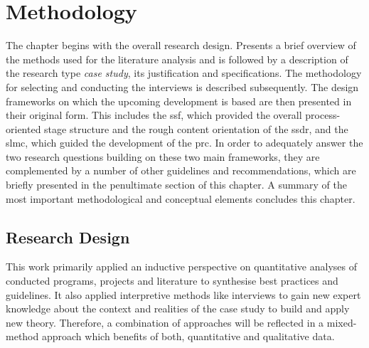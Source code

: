 \chapter{Methodology}

\label{chapter3}

The chapter begins with the overall research design. Presents a brief overview of the methods used for the literature analysis and  is followed by a description of the research type \textit{case study}, its justification and specifications. The methodology for  selecting and conducting the interviews is described subsequently. The design frameworks on which the upcoming development is based are then presented in their original form. This includes the \acrfull{ssf}, which provided the overall process-oriented stage structure and the rough content orientation of the \acrfull{ssdr}, and the \acrfull{slmc}, which guided the development of the \acrfull{prc}. In order to adequately answer the two research questions building on these two main frameworks, they are complemented by a number of other guidelines and recommendations, which are briefly presented in the penultimate section of this chapter. A summary of the most important methodological and conceptual elements concludes this chapter.   


\section{Research Design}

This work primarily applied an inductive perspective on quantitative analyses of conducted programs, projects and literature to synthesise best practices and guidelines. It also applied interpretive methods like interviews to gain new expert knowledge about the context and realities of the case study to build and apply new theory. Therefore, a combination of approaches will be reflected in a mixed-method approach which benefits of both, quantitative and qualitative data.

